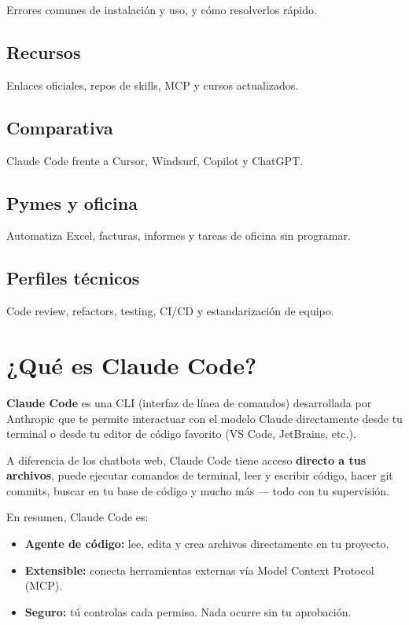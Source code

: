 \documentclass[11pt,a4paper]{report}
\begin{document}
Errores comunes de instalación y uso, y cómo resolverlos rápido.

\subsection{Recursos}

Enlaces oficiales, repos de skills, MCP y cursos actualizados.

\subsection{Comparativa}

Claude Code frente a Cursor, Windsurf, Copilot y ChatGPT.

\subsection{Pymes y oficina}

Automatiza Excel, facturas, informes y tareas de oficina sin programar.

\subsection{Perfiles técnicos}

Code review, refactors, testing, CI/CD y estandarización de equipo.

\section{¿Qué es Claude Code?}

\textbf{Claude Code} es una CLI (interfaz de línea de comandos) desarrollada por Anthropic que te permite interactuar con el modelo Claude directamente desde tu terminal o desde tu editor de código favorito (VS Code, JetBrains, etc.).

A diferencia de los chatbots web, Claude Code tiene acceso \textbf{directo a tus archivos}, puede ejecutar comandos de terminal, leer y escribir código, hacer git commits, buscar en tu base de código y mucho más — todo con tu supervisión.

En resumen, Claude Code es:
\begin{itemize}
  \item \textbf{Agente de código:} lee, edita y crea archivos directamente en tu proyecto.
  \item \textbf{Extensible:} conecta herramientas externas vía Model Context Protocol (MCP).
  \item \textbf{Seguro:} tú controlas cada permiso. Nada ocurre sin tu aprobación.
\end{itemize}
\end{document}
